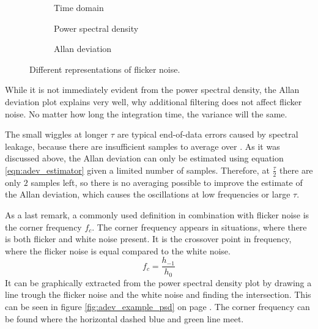 \begin{figure}[ht]
    \centering
    \begin{subfigure}{0.32\linewidth}
        \centering
        \scalebox{0.75}{%
            
        } %
        \caption{Time domain}
        \label{fig:flicker_noise_time}
    \end{subfigure}
    \begin{subfigure}{0.32\linewidth}
        \centering
        \scalebox{0.75}{%
            
        } %
        \caption{Power spectral density}
        \label{fig:flicker_noise_psd}
    \end{subfigure}
    \begin{subfigure}{0.32\linewidth}
        \centering
        \scalebox{0.75}{%
            
        } %
        \caption{Allan deviation}
        \label{fig:flicker_noise_adev}
    \end{subfigure}
    \caption{Different representations of flicker noise.}
    \label{fig:flicker_noise_simulated}
\end{figure}

While it is not immediately evident from the power spectral density, the Allan deviation plot explains very well, why additional filtering does not affect flicker noise. No matter how long the integration time, the variance will the same.

The small wiggles at longer $\tau$ are typical end-of-data errors caused by spectral leakage, because there are insufficient samples to average over \cite{adev_long_tau}. As it was discussed above, the Allan deviation can only be estimated using equation \ref{eqn:adev_estimator} given a limited number of samples. Therefore, at $\frac{\tau}{2}$ there are only $2$ samples left, so there is no averaging possible to improve the estimate of the Allan deviation, which causes the oscillations at low frequencies or large $\tau$.

As a last remark, a commonly used definition in combination with flicker noise is the corner frequency $f_c$. The corner frequency appears in situations, where there is both flicker and white noise present. It is the crossover point in frequency, where the flicker noise is equal compared to the white noise.
\begin{equation}
    f_c = \frac{h_{-1}}{h_0} \label{eqn:corner_frequency}
\end{equation}
It can be graphically extracted from the power spectral density plot by drawing a line trough the flicker noise and the white noise and finding the intersection. This can be seen in figure \ref{fig:adev_example_psd} on page \pageref{fig:adev_example_psd}. The corner frequency can be found where the horizontal dashed blue and green line meet.

